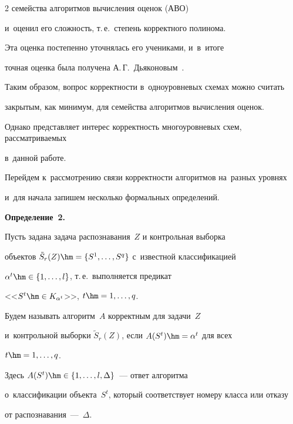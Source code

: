\begin{multicols}{2}
семейства алгоритмов вычисления оценок (АВО)~\cite{zhur1,zhur2} 


и~оценил его сложность, т.\,е.\ степень корректного полинома.


Эта оценка постепенно уточнялась его учениками, и~в~итоге 


точная оценка была получена А.\,Г.~Дьяконовым~\cite{djakonov}.


Таким образом, вопрос корректности в~одноуровневых схемах можно считать 


закрытым, как минимум, для семейства алгоритмов вычисления оценок.


Однако представляет интерес корректность многоуровневых схем, рассматриваемых 


в~данной работе.


Перейдем к~рассмотрению связи корректности алгоритмов на~разных уровнях 


и~для начала запишем несколько формальных определений.





\smallskip





\noindent


\textbf{Определение~2.}\


Пусть задана задача распознавания~$Z$ и контрольная выборка 


объектов $\tilde{S}_r(Z)\hm=\{S^1,\ldots,S^q\}$ с~известной классификацией 


$\alpha^t\hm\in\{1,\ldots,l\}$, т.\,е.\ выполняется предикат 


<<$S^t\hm\in K_{\alpha^t}$>>, $t\hm=1,\ldots,q$.


Будем называть алгоритм~$A$ корректным для задачи~$Z$ 


и~контрольной выборки $\tilde{S}_r(Z)$, если $A(S^t)\hm=\alpha^t$ для всех 


$t\hm=1,\ldots,q$.


Здесь $A(S^t)\hm\in\{1,\ldots,l,\Delta\}$~--- ответ алгоритма 


о~классификации объекта~$S^t$, который соответствует номеру класса или отказу 


от распознавания~---~$\Delta$.








\smallskip






\end{multicols}
